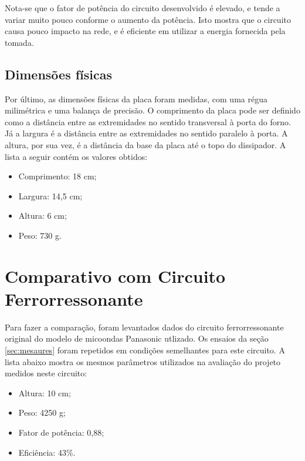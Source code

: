 Nota-se que o fator de potência do circuito desenvolvido é elevado, e tende a variar muito pouco conforme o aumento da potência. Isto mostra que o circuito causa pouco impacto na rede, e é eficiente em utilizar a energia fornecida pela tomada.


\subsection{Dimensões físicas}
Por último, as dimensões físicas da placa foram medidas, com uma régua milimétrica e uma balança de precisão. O comprimento da placa pode ser definido como a distância entre as extremidades no sentido transversal à porta do forno. Já a largura é a distância entre as extremidades no sentido paralelo à porta. A altura, por sua vez, é a distância da base da placa até o topo do dissipador. A lista a seguir contém os valores obtidos:

\bigskip
\begin{itemize}
    \item Comprimento: 18 cm;
    \item Largura: 14,5 cm;
    \item Altura: 6 cm;
    \item Peso: 730 g.
\end{itemize}
\bigskip

\section{Comparativo com Circuito Ferrorressonante}

Para fazer a comparação, foram levantados dados do circuito ferrorressonante original do modelo de micoondas Panasonic utlizado. Os ensaios da seção \ref{sec:mesaures} foram repetidos em condições semelhantes para este circuito.  A lista abaixo mostra os mesmos parâmetros utilizados na avaliação do projeto medidos neste circuito: 

\bigskip
\begin{itemize}
    \item Altura: 10 cm;
    \item Peso: 4250 g;
    \item Fator de potência: 0,88;
    \item Eficiência: 43\%.
\end{itemize}
\bigskip

